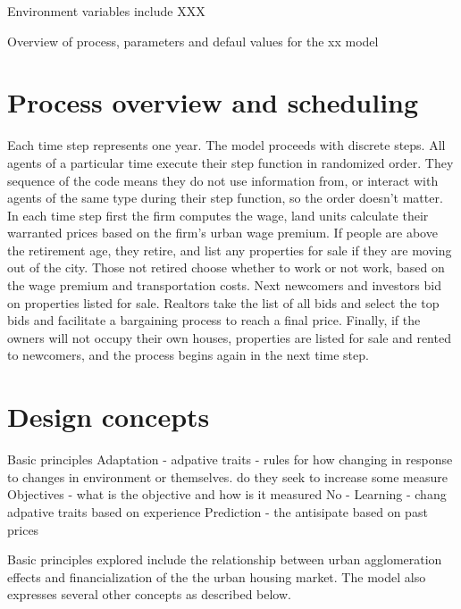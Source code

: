 Environment variables include XXX

Overview of process, parameters and defaul values for the xx model

\section{Process overview and scheduling}

Each time step represents one year. The model proceeds with discrete steps. All agents of a particular time execute their step function in randomized order. They sequence of the code means they do not use information from, or interact with agents of the same type during their step function, so the order doesn't matter. In each time step first the firm computes the wage, land units calculate their warranted prices based on the firm's urban wage premium. If people are above the retirement age, they retire, and list any properties for sale if they are moving out of the city. Those not retired choose whether to work or not work, based on the wage premium and transportation costs. Next newcomers and investors bid on properties listed for sale. Realtors take the list of all bids and select the top bids and facilitate a bargaining process to reach a final price. Finally, if the owners will not occupy their own houses, properties are listed for sale and rented to newcomers, and the process begins again in the next time step. 



\section{Design concepts}

Basic principles
Adaptation - adpative traits - rules for  how changing in response to changes in environment or themselves. do they seek to increase some measure
Objectives - what is the objective and how is it measured
No - Learning - chang adpative traits based on experience
Prediction - the antisipate based on past prices





Basic principles explored include the relationship between urban agglomeration effects and financialization of the the urban housing market. The model also expresses several other concepts as described below.

